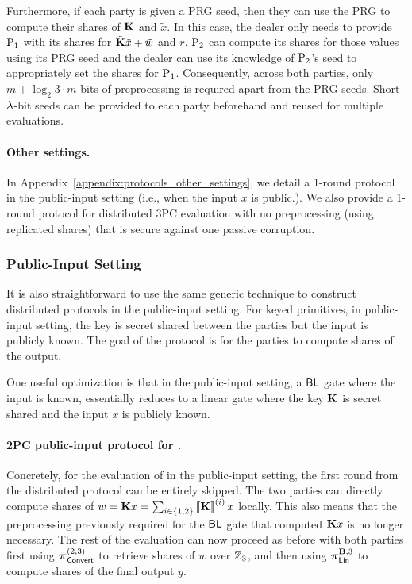Furthermore, if each party is given a PRG seed, then they can use the PRG to compute their shares of $\tilde{\mat{K}}$ and $\tilde{x}$. In this case, the dealer only needs to provide $\textnormal{P}_1$ with its shares for $\tilde{\mat{K}}\tilde{x} + \tilde{w}$ and $r$. $\textnormal{P}_2$ can compute its shares for those values using its PRG seed and the dealer can use its knowledge of $\textnormal{P}_2$'s seed to appropriately set the shares for $\textnormal{P}_1$. Consequently, across both parties, only $m + \log_2{3} \cdot m$ bits of preprocessing is required apart from the PRG seeds. Short $\lambda$-bit seeds can be provided to each party beforehand and reused for multiple evaluations.

\iffull\else
\paragraph{Other settings.} In Appendix~\ref{appendix:protocols_other_settings}, we detail a 1-round protocol in the public-input setting (i.e., when the input $x$ is public.). We also provide a 1-round protocol for distributed 3PC evaluation with no preprocessing (using replicated shares) that is secure against one passive corruption.
\fi

\fi

\iffull
\subsubsection{Public-Input Setting}
It is also straightforward to use the same generic technique to construct distributed protocols in the public-input setting. For keyed primitives, in public-input setting, the key is secret shared between the parties but the input is publicly known. The goal of the protocol is for the parties to compute shares of the output.

One useful optimization is that in the public-input setting, a $\textnormal{\textsf{BL}}$ gate where the input is known, essentially reduces to a linear gate where the key $\mat{K}$ is secret shared and the input $x$ is publicly known.

\paragraph{2PC public-input protocol for \ttwPRF.}
Concretely, for the evaluation of \ttwPRF in the public-input setting, the first round from the distributed protocol can be entirely skipped. The two parties can directly compute shares of $w = \mat{K}x = \sum_{i \in \{1,2\}} \sharei{\mat{K}}x$ locally. This also means that the preprocessing previously required for the $\textnormal{\textsf{BL}}$ gate that computed $\mat{K}x$ is no longer necessary. The rest of the evaluation can now proceed as before with both parties first using $\boldsymbol{\pi}_{\textnormal{\textsf{Convert}}}^{(2,3)}$ to retrieve shares of $w$ over $\mathbb{Z}_3$, and then using $\prot_\LMap^{\mat{B},3}$ to compute shares of the final output $y$.

